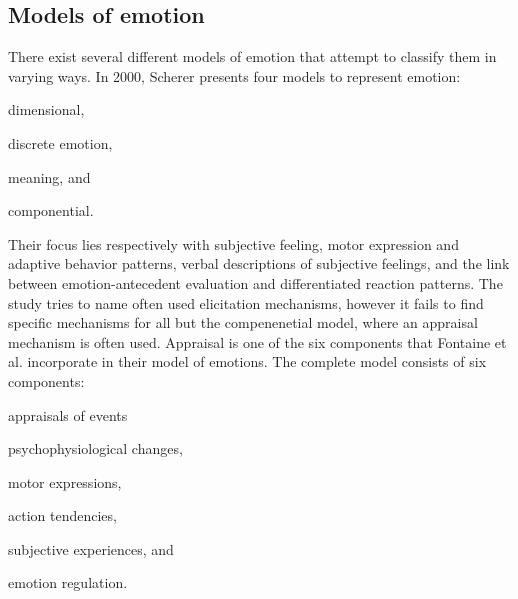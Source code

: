 \documentclass{sigchi}
\begin{document}

\subsection{Models of emotion} %
\label{sub:models_of_emotion}
There exist several different models of emotion that attempt to classify them in varying ways. In 2000, Scherer \cite{scherer2000} presents four models to represent emotion:
\begin{enumerate*}[label=(\alph*)]
  \item dimensional,
  \item discrete emotion,
  \item meaning, and
  \item componential.
\end{enumerate*}
Their focus lies respectively with subjective feeling, motor expression and adaptive behavior patterns, verbal descriptions of subjective feelings, and the link between emotion-antecedent evaluation and differentiated reaction patterns. The study tries to name often used elicitation mechanisms, however it fails to find specific mechanisms for all but the compenenetial model, where an appraisal mechanism is often used. Appraisal is one of the six components that Fontaine et al. \cite{Fontaine2007} incorporate in their model of emotions. The complete model consists of six components:
\begin{enumerate*}[label=(\alph*)]
  \item appraisals of events
  \item psychophysiological changes,
  \item motor expressions,
  \item action tendencies,
  \item subjective experiences, and
  \item emotion regulation.
\end{enumerate*}
\end{document}
